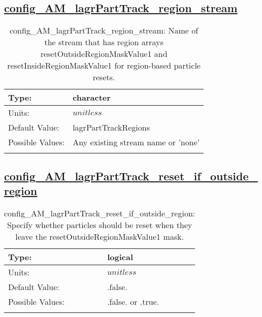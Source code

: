 \subsection[config\_AM\_lagrPartTrack\_region\_stream]{\hyperref[sec:nm_tab_AM_lagrPartTrack]{config\_AM\_lagrPartTrack\_region\_stream}}
\label{subsec:nm_sec_config_AM_lagrPartTrack_region_stream}
\begin{center}
\begin{longtable}{| p{2.0in} || p{4.0in} |}
    \hline
    Type: & character \\
    \hline
    Units: & $unitless$ \\
    \hline
    Default Value: & lagrPartTrackRegions \\
    \hline
    Possible Values: & Any existing stream name or 'none' \\
    \hline
    \caption{config\_AM\_lagrPartTrack\_region\_stream: Name of the stream that has region arrays resetOutsideRegionMaskValue1 and resetInsideRegionMaskValue1 for region-based particle resets.}
\end{longtable}
\end{center}
\subsection[config\_AM\_lagrPartTrack\_reset\_if\_outside\_region]{\hyperref[sec:nm_tab_AM_lagrPartTrack]{config\_AM\_lagrPartTrack\_reset\_if\_outside\_region}}
\label{subsec:nm_sec_config_AM_lagrPartTrack_reset_if_outside_region}
\begin{center}
\begin{longtable}{| p{2.0in} || p{4.0in} |}
    \hline
    Type: & logical \\
    \hline
    Units: & $unitless$ \\
    \hline
    Default Value: & .false. \\
    \hline
    Possible Values: & .false. or .true. \\
    \hline
    \caption{config\_AM\_lagrPartTrack\_reset\_if\_outside\_region: Specify whether particles should be reset when they leave the resetOutsideRegionMaskValue1 mask.}
\end{longtable}
\end{center}
